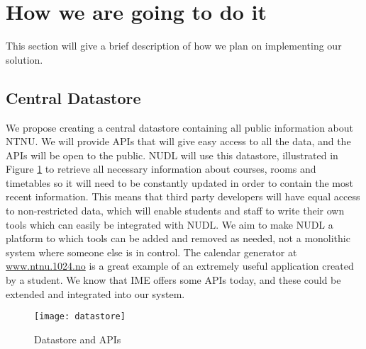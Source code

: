 \section{How we are going to do it}
	This section will give a brief description of how we plan on implementing our solution. 
	
	\subsection{Central Datastore}
		We propose creating a central datastore containing all public information about NTNU. We will provide APIs that will give easy access to all the data, and the APIs will be open to the public. 
NUDL will use this datastore, illustrated in Figure \ref{fig:datastore} to retrieve all necessary information about courses, rooms and timetables so it will need to be constantly updated in order to contain the most recent information. This means that third party developers will have equal access to non-restricted data, which will enable students and staff to write their own tools which can easily be integrated with NUDL. We aim to make NUDL a platform to which tools can be added and removed as needed, not a monolithic system where someone else is in control. The calendar generator at \url{www.ntnu.1024.no} is a great example of an extremely useful application created by a student. We know that IME offers some APIs today, and these could be extended and integrated into our system.
\begin{figure}[h]
\centering
\texttt{[image: datastore]}
\caption{Datastore and APIs}
\label{fig:datastore}
\end{figure}

